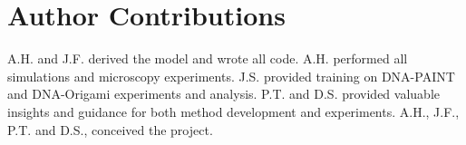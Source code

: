 \section{Author Contributions}
A.H. and J.F. derived the model and wrote all code.
%
A.H. performed all simulations and microscopy experiments. 
%
J.S. provided training on DNA-PAINT and DNA-Origami experiments and analysis.
%
P.T. and D.S. provided valuable insights and guidance for both method development and experiments.
%
A.H., J.F., P.T. and D.S., conceived the project.